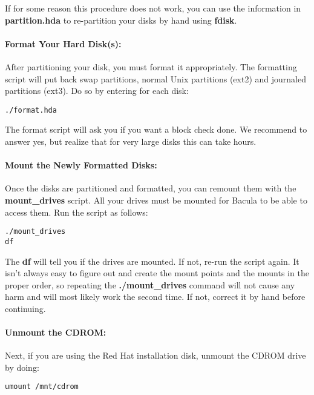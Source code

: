 If for some reason this procedure does not work, you can use the information
in {\bf partition.hda} to re-partition your disks by hand using {\bf fdisk}. 

\paragraph*{Format Your Hard Disk(s):}

After partitioning your disk, you must format it appropriately. The formatting
script will put back swap partitions, normal Unix partitions (ext2) and
journaled partitions (ext3). Do so by entering for each disk: 

\footnotesize
\begin{verbatim}
./format.hda
\end{verbatim}
\normalsize

The format script will ask you if you want a block check done. We recommend to
answer yes, but realize that for very large disks this can take hours. 

\paragraph*{Mount the Newly Formatted Disks:}

Once the disks are partitioned and formatted, you can remount them with the
{\bf mount\_drives} script. All your drives must be mounted for Bacula to be
able to access them. Run the script as follows: 

\footnotesize
\begin{verbatim}
./mount_drives
df
\end{verbatim}
\normalsize

The {\bf df} will tell you if the drives are mounted. If not, re-run the
script again. It isn't always easy to figure out and create the mount points
and the mounts in the proper order, so repeating the {\bf ./mount\_drives}
command will not cause any harm and will most likely work the second time. If
not, correct it by hand before continuing. 

\paragraph*{Unmount the CDROM:}

Next, if you are using the Red Hat installation disk, unmount the CDROM drive
by doing: 

\footnotesize
\begin{verbatim}
umount /mnt/cdrom
\end{verbatim}
\normalsize

